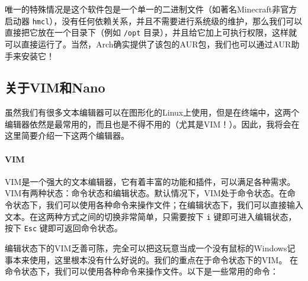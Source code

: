 唯一的特殊情况是这个软件包是一个单一的二进制文件（如著名Minecraft非官方启动器 \verb|hmcl|），没有任何依赖关系，并且不需要进行系统级的维护，那么我们可以直接把它放在一个目录下（例如 \verb|/opt| 目录），并且给它加上可执行权限，这样就可以直接运行了。当然，Arch确实提供了该包的AUR包，我们也可以通过AUR助手来安装它！

\subsection{关于VIM和Nano}

虽然我们有很多文本编辑器可以在图形化的Linux上使用，但是在终端中，这两个编辑器依然是最常用的，而且也是不得不用的（尤其是VIM！）。因此，我将会在这里简要介绍一下这两个编辑器。

\paragraph{VIM}\label{sec:vim}

VIM是一个强大的文本编辑器，它有着丰富的功能和插件，可以满足各种需求。
VIM有两种状态：命令状态和编辑状态。默认情况下，VIM处于命令状态。在命令状态下，我们可以使用各种命令来操作文件；在编辑状态下，我们可以直接输入文本。在这两种方式之间的切换非常简单，只需要按下 \texttt{i} 键即可进入编辑状态，按下 \texttt{Esc} 键即可返回命令状态。

编辑状态下的VIM乏善可陈，完全可以把这玩意当成一个没有鼠标的Windows记事本来使用，这里根本没有什么好说的。我们的重点在于命令状态下的VIM。
在命令状态下，我们可以使用各种命令来操作文件。以下是一些常用的命令：

